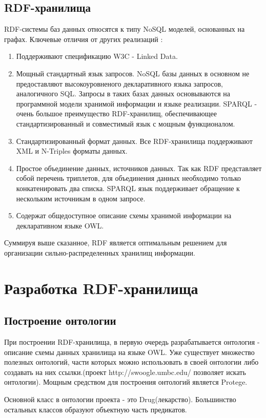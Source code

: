 \documentclass[specialist,subf,href,colorlinks=true
]{disser}
\begin{document}
\section{RDF-хранилища}
RDF-системы баз данных относятся к типу NoSQL моделей, основанных на графах. Ключевые отличия от других реализаций \cite{rdfdiff}:
\begin{enumerate}
 \item Поддерживают спецификацию W3C - Linked Data. 
 \item Мощный стандартный язык запросов. NoSQL базы данных в основном не предоставляют высокоуровненого декларативного языка запросов, аналогичного SQL. Запросы в таких базах данных основываются на программной модели хранимой информации и языке реализации. SPARQL - очень большое преимущество RDF-хранилищ, обеспечивающее стандартизированный и совместимый язык с мощным функционалом. 
 \item Стандартизированный формат данных. Все RDF-хранилища поддерживают XML и N-Triples форматы данных.
 \item Простое объединение данных, источников данных. Так как RDF представляет собой перечень триплетов, для объединения данных необходимо только конкатенировать два списка. SPARQL язык поддерживает обращение к нескольким источникам в одном запросе.
 \item Содержат общедоступное описание схемы хранимой информации на декларативном языке OWL.
\end{enumerate}
 
Суммируя выше сказанное, RDF является оптимальным решением для организации сильно-распределенных хранилищ информации. 

\chapter{Разработка RDF-хранилища}

\section{Построение онтологии}
При построении RDF-хранилища, в первую очередь разрабатывается онтология - описание схемы данных хранилища на языке OWL. Уже существует множество полезных онтологий, части которых можно использовать в своей онтологии либо создавать на них ссылки.(проект http://swoogle.umbc.edu/ позволяет искать онтологии). Мощным средством для построения онтологий является Protege.

Основной класс в онтологии проекта - это Drug(лекарство). Большинство остальных классов образуют объектную часть предикатов.
\end{document}
